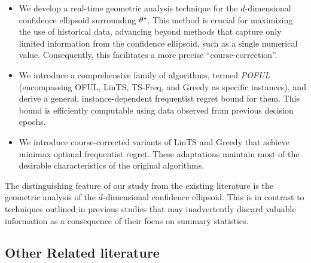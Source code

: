     \begin{itemize}
    \item We develop a real-time geometric analysis technique for the $d$-dimensional confidence ellipsoid surrounding $\theta^\star$. This method is crucial for maximizing the use of historical data, advancing beyond methods that capture only limited information from the confidence ellipsoid, such as a single numerical value. Consequently, this facilitates a more precise ``course-correction''.

    \item We introduce a comprehensive family of algorithms, termed \emph{POFUL} (encompassing OFUL, LinTS, TS-Freq, and Greedy as specific instances), and derive a general, instance-dependent frequentist regret bound for them. This bound is efficiently computable using data observed from previous decision epochs.

    \item  We introduce course-corrected variants of LinTS and Greedy that achieve minimax optimal frequentist regret. These adaptations maintain most of the desirable characteristics of the original algorithms.
    \end{itemize}



The distinguishing feature of our study from the existing literature is the geometric analysis of the $d$-dimensional confidence ellipsoid. 	This is in contrast to techniques outlined in previous studies that may inadvertently discard valuable information as a consequence of their focus on summary statistics.

\subsection{Other Related literature} 

